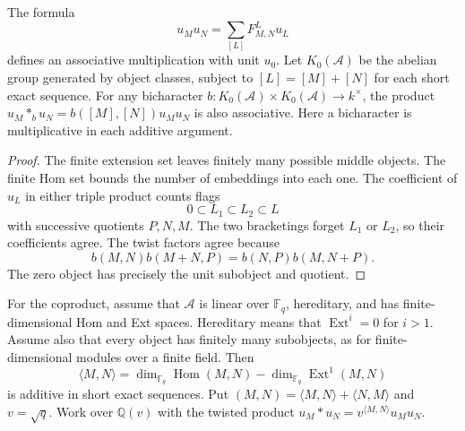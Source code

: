 \begin{proposition}\label{v4-arith:hall:prop:product}
The formula
\[
 u_Mu_N=\sum_{[L]}F^L_{M,N}u_L
\]
defines an associative multiplication with unit $u_0$.
Let $K_0(\mathcal A)$ be the abelian group generated by object classes,
subject to $[L]=[M]+[N]$ for each short exact sequence.
For any bicharacter
$b:K_0(\mathcal A)\times K_0(\mathcal A)\to k^\times$, the product
$u_M*_b u_N=b([M],[N])u_Mu_N$ is also associative.
Here a bicharacter is multiplicative in each additive argument.
\end{proposition}
\begin{proof}
The finite extension set leaves finitely many possible middle objects.
The finite Hom set bounds the number of embeddings into each one.
The coefficient of $u_L$ in either triple product counts flags
\[
 0\subset L_1\subset L_2\subset L
\]
with successive quotients $P,N,M$. The two bracketings forget
$L_1$ or $L_2$, so their coefficients agree. The twist factors agree
because
\[
 b(M,N)b(M+N,P)=b(N,P)b(M,N+P).
\]
The zero object has precisely the unit subobject and quotient.
\end{proof}

For the coproduct, assume that $\mathcal A$ is linear over
$\mathbb F_q$, hereditary, and has finite-dimensional Hom and Ext
spaces. Hereditary means that $\operatorname{Ext}^i=0$ for $i>1$.
Assume also that every object has finitely many subobjects, as for
finite-dimensional modules over a finite field.
Then
\[
 \langle M,N\rangle
 =\dim_{\mathbb F_q}\operatorname{Hom}(M,N)
  -\dim_{\mathbb F_q}\operatorname{Ext}^1(M,N)
\]
is additive in short exact sequences. Put
$(M,N)=\langle M,N\rangle+\langle N,M\rangle$ and $v=\sqrt q$.
Work over $\mathbb Q(v)$ with the twisted product
$u_M*u_N=v^{\langle M,N\rangle}u_Mu_N$.

